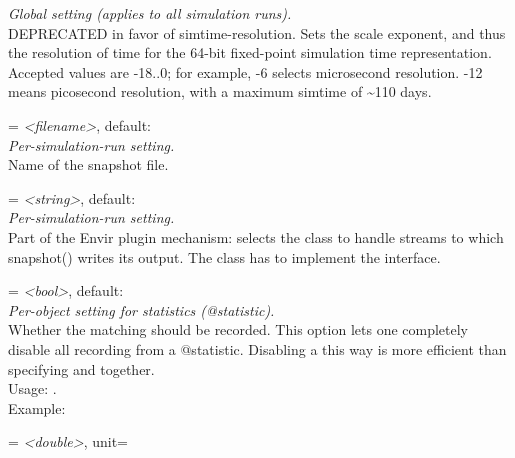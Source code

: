\begin{description}
    \textit{Global setting (applies to all simulation runs).}\\
    DEPRECATED in favor of simtime-resolution. Sets the scale exponent, and
    thus the resolution of time for the 64-bit fixed-point simulation time
    representation. Accepted values are -18..0; for example, -6 selects
    microsecond resolution. -12 means picosecond resolution, with a maximum
    simtime of {\textasciitilde}110 days.
\item[snapshot-file] = \textit{<filename>}, default: \\
    \textit{Per-simulation-run setting.}\\
    Name of the snapshot file.
\item[snapshotmanager-class] = \textit{<string>}, default: \\
    \textit{Per-simulation-run setting.}\\
    Part of the Envir plugin mechanism: selects the class to handle streams to
    which snapshot() writes its output. The class has to implement the
     interface.
\item[**.statistic-recording] = \textit{<bool>}, default: \\
    \textit{Per-object setting for statistics (@statistic).}\\
    Whether the matching  should be recorded. This
    option lets one completely disable all recording from a @statistic.
    Disabling a  this way is more efficient than
    specifying
     and
    together.\\
    Usage:
    .\\
    Example:
\item[total-stack] = \textit{<double>}, unit=\\

\end{description}
